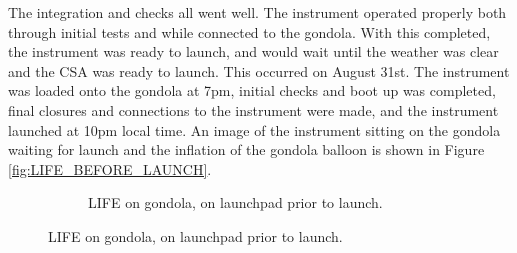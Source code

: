 The integration and checks all went well. The instrument operated properly both through initial tests and while connected to the gondola. With this completed, the instrument was ready to launch, and would wait until the weather was clear and the CSA was ready to launch. This occurred on August 31st. The instrument was loaded onto the gondola at 7pm, initial checks and boot up was completed, final closures and connections to the instrument were made, and the instrument launched at 10pm local time. An image of the instrument sitting on the gondola waiting for launch and the inflation of the gondola balloon is shown in Figure \ref{fig:LIFE_BEFORE_LAUNCH}.

\begin{figure}
    \begin{subfigure}[h]{0.49\textwidth}
        \centering
        \caption{LIFE on gondola, on launchpad prior to launch.}

\end{subfigure}
\end{figure}
